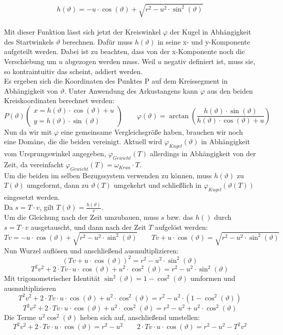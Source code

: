 \[
h(\vartheta) = -u\cdot \cos(\vartheta)+\sqrt{r^2 - u^2 \cdot \sin^2(\vartheta)}
\]
\\
Mit dieser Funktion lässt sich jetzt der Kreiswinkel $\varphi$ der Kugel in Abhängigkeit des Startwinkels $\vartheta$ berechnen. Dafür muss $h(\vartheta)$ in seine x- und y-Komponente aufgeteilt werden. Dabei ist zu beachten, dass von der x-Komponente noch die Verschiebung um $u$ abgezogen werden muss. Weil $u$ negativ definiert ist, muss sie, so kontraintuitiv  das scheint, addiert werden.
\\
Es ergeben sich die Koordinaten des Punktes P auf dem Kreissegment in Abhängigkeit von $\vartheta$. Unter Anwendung des Arkustangens kann $\varphi$ aus den beiden Kreiskoordinaten berechnet werden:
\[
P(\vartheta) \left(
\begin{array}{l}
	x = h(\vartheta)\cdot \cos(\vartheta) + u \\
	y = h(\vartheta)\cdot \sin(\vartheta)
\end{array}
\right)
\qquad \varphi(\vartheta) = \arctan\left(\frac{h(\vartheta)\cdot \sin(\vartheta)}{h(\vartheta)\cdot \cos(\vartheta) + u}\right)
\]
Nun da wir mit $\varphi$ eine gemeinsame Vergleichsgröße haben, brauchen wir noch eine Domäne, die die beiden vereinigt. Aktuell wird $\varphi_{Kugel}(\vartheta)$ in Abhängigkeit vom Ursprungswinkel angegeben, $\varphi_{Gewicht}(T)$ allerdings in Abhängigkeit von der Zeit, da vereinfacht $\varphi_{Gewicht}(T) = \omega_{Kran}\cdot T$.
\\
Um die beiden im selben Bezugssystem verwenden zu können, muss $h(\vartheta)$ zu $T(\vartheta)$ umgeformt, dann zu $\vartheta(T)$ umgekehrt und schließlich in $\varphi_{Kugel}(\vartheta(T))$ eingesetzt werden.
\\
Da $s=T\cdot v$, gilt $T(\vartheta)=\frac{h(\vartheta)}{v}$.
\\
Um die Gleichung nach der Zeit umzubauen, muss $s$ bzw. das $h()$ durch $s=T\cdot v$ ausgetauscht, und dann nach der Zeit $T$ aufgelöst werden:
\[
T v = -u \cdot \cos(\vartheta) + \sqrt{r^2 - u^2 \cdot \sin^2(\vartheta)}
\qquad Tv + u \cdot \cos(\vartheta) = \sqrt{r^2 - u^2 \cdot \sin^2(\vartheta)}
\]
Nun Wurzel auflösen und anschließend ausmultiplizieren:
\[
(T v + u \cdot \cos(\vartheta))^2 = r^2 - u^2 \cdot \sin^2(\vartheta)
\]
\[
T^2 v^2 + 2\cdot T v \cdot u \cdot \cos(\vartheta) + u^2\cdot \cos^2(\vartheta) = r^2 - u^2 \cdot \sin^2(\vartheta)
\]
Mit trigonometrischer Identität $\sin^2(\vartheta) = 1 - \cos^2(\vartheta)$ umformen und ausmultiplizieren
\[
T^2 v^2 + 2\cdot T v \cdot u \cdot \cos(\vartheta) + u^2\cdot \cos^2(\vartheta) = r^2 - u^2 \cdot (1 - \cos^2(\vartheta))
\]
\[
T^2 v^2 + 2\cdot T v \cdot u \cdot \cos(\vartheta) + u^2\cdot \cos^2(\vartheta) = r^2 - u^2 + u^2\cdot \cos^2(\vartheta)
\]
Die Terme $u^2 \cos^2(\vartheta)$ heben sich auf, anschließend umstellen: 
\[
T^2 v^2 + 2 \cdot T v \cdot u \cdot \cos(\vartheta) = r^2 - u^2
\qquad 2\cdot T v \cdot u \cdot \cos(\vartheta) = r^2 - u^2 - T^2 v^2
\]

